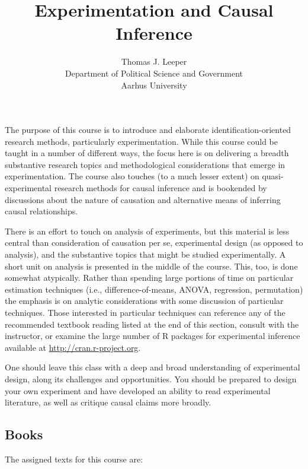 \documentclass[12pt,a4paper]{article}
\title{Experimentation and Causal Inference}
\author{Thomas J. Leeper\\
Department of Political Science and Government\\
Aarhus University}
\begin{document}
\nobibliography*

\maketitle

\faketableofcontents


The purpose of this course is to introduce and elaborate identification-oriented research methods, particularly experimentation. While this course could be taught in a number of different ways, the focus here is on delivering a breadth substantive research topics and methodological considerations that emerge in experimentation. The course also touches (to a much lesser extent) on quasi-experimental research methods for causal inference and is bookended by discussions about the nature of causation and alternative means of inferring causal relationships.

There is an effort to touch on analysis of experiments, but this material is less central than consideration of causation per se, experimental design (as opposed to analysis), and the substantive topics that might be studied experimentally. A short unit on analysis is presented in the middle of the course. This, too, is done somewhat atypically. Rather than spending large portions of time on particular estimation techniques (i.e., difference-of-means, ANOVA, regression, permutation) the emphasis is on analytic considerations with some discussion of particular techniques. Those interested in particular techniques can reference any of the recommended textbook reading listed at the end of this section, consult with the instructor, or examine the large number of R packages for experimental inference available at \url{http://cran.r-project.org}.

One should leave this class with a deep and broad understanding of experimental design, along its challenges and opportunities. You should be prepared to design your own experiment and have developed an ability to read experimental literature, as well as critique causal claims more broadly.

\subsection*{Books}
The assigned texts for this course are:
\end{document}
